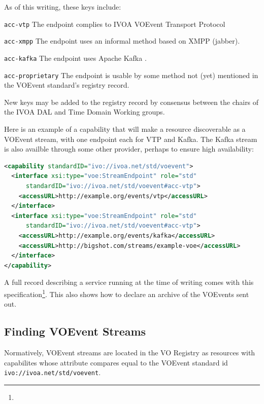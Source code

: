 \documentclass[11pt,a4paper]{ivoa}
\begin{document}
As of this writing, these keys include:

\begin{compactitem}
\item  \verb|acc-vtp| The endpoint complies to IVOA VOEvent Transport
  Protocol \citep{2017ivoa.spec.0320S}
\item \verb|acc-xmpp| The endpoint uses an informal method based on
    	XMPP (jabber).
\item \verb|acc-kafka| The endpoint uses Apache Kafka \citep{kafka}.
\item \verb|acc-proprietary| The endpoint is usable by some
  method not (yet) mentioned in the VOEvent standard's registry record.
\end{compactitem}

New keys may be added to the registry record by consensus between the
chairs of the IVOA DAL and Time Domain Working groups.

Here is an example of a capability that will make a resource
discoverable as a VOEvent stream, with one endpoint each for VTP and
Kafka.  The Kafka stream is also availble through some other
provider, perhaps to ensure high availability:

\begin{lstlisting}[language=XML]
<capability standardID="ivo://ivoa.net/std/voevent">
  <interface xsi:type="voe:StreamEndpoint" role="std"
      standardID="ivo://ivoa.net/std/voevent#acc-vtp">
    <accessURL>http://example.org/events/vtp</accessURL>
  </interface>
  <interface xsi:type="voe:StreamEndpoint" role="std"
      standardID="ivo://ivoa.net/std/voevent#acc-vtp">
    <accessURL>http://example.org/events/kafka</accessURL>
    <accessURL>http://bigshot.com/streams/example-voe</accessURL>
  </interface>
</capability>
\end{lstlisting}

A full record describing a service running at the time of writing
comes with this
specification\footnote{}.  This also
shows how to declare an archive of the VOEvents sent out.

\subsection{Finding VOEvent Streams}

Normatively, VOEvent streams are located in the VO Registry as resources
with capabilites whose  attribute compares equal to
the VOEvent standard id \nolinkurl{ivo://ivoa.net/std/voevent}.
\end{document}
